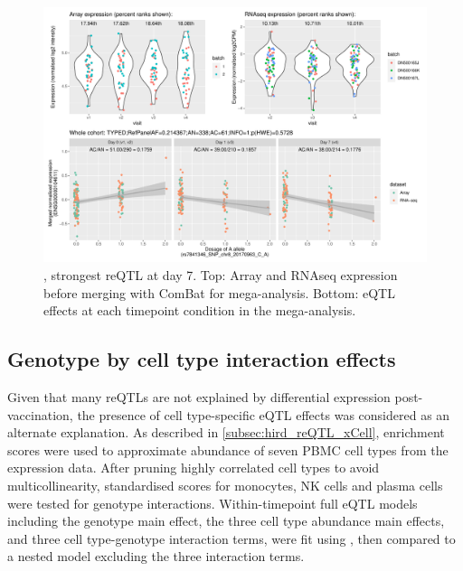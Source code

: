 \begin{figure}
    \centering
    \includegraphics[width=1.0\textwidth,page=1]{mainmatter/figures/chapter_03/plot_dge_eqtl_genotypes.ENSG00000104611,rs7841346_SNP_chr8_20170963_C_A.pdf}
    \caption{, strongest reQTL at day 7. Top: Array and \gls{RNAseq} expression before merging with ComBat for mega-analysis. Bottom: eQTL effects at each timepoint condition in the mega-analysis.}
    \label{fig:hird_eQTL_ploteQTL_SH2D4A}
\end{figure}

\subsection{Genotype by cell type interaction effects}

Given that many \glspl{reQTL} are not explained by differential expression post-vaccination, the presence of cell type-specific \gls{eQTL} effects was considered as an alternate explanation.
As described in \autoref{subsec:hird_reQTL_xCell},  enrichment scores were used to approximate abundance of seven \gls{PBMC} cell types from the expression data.
After pruning highly correlated cell types to avoid multicollinearity, standardised scores for monocytes, \gls{NK} cells and plasma cells were tested for genotype interactions.
Within-timepoint full \gls{eQTL} models including the genotype main effect, the three cell type abundance main effects, and three cell type-genotype interaction terms, were fit using , 
then compared to a nested model excluding the three interaction terms.


